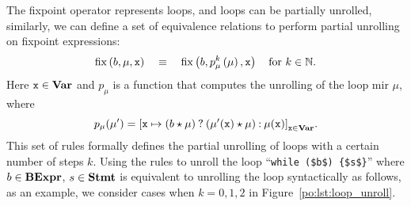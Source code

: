 The fixpoint operator represents loops, and loops can be partially unrolled,
similarly, we can define a set of equivalence relations to perform partial
unrolling on fixpoint expressions:
\begin{equation}
    \operatorname{\mathrm{fix}}\left(b, \mu, \texttt{x}\right)
    \quad \equiv \quad
    \operatorname{\mathrm{fix}}\left(b, p_\mu^k \left(\mu\right), \texttt{x}\right)
    \quad \text{for $k \in \mathbb{N}$}.
    \label{po:eq:unroll}
\end{equation}
Here $\texttt{x} \in \mathbf{Var}$ and $p_\mu$ is a function that computes the unrolling
of the loop \gls{mir} $\mu$, where
\begin{equation}
    p_\mu(\mu^\prime) = {\left[
        \texttt{x} \mapsto ( b \mathbin{\star} \mu ) \mathbin{?}
            ( \mu^\prime(\texttt{x}) \mathbin{\star} \mu ) \mathbin{:} \mu(\texttt{x})
    \right]}_{\texttt{x} \in \mathbf{Var}}.
\end{equation}
This set of rules formally defines the partial unrolling of loops with
a certain number of steps $k$.  Using the rules to unroll the loop
``\lstinline[basicstyle=\tt]|while ($b$) {$s$}|'' where $b \in \mathbf{BExpr}$,
$s \in \mathbf{Stmt}$ is equivalent to unrolling the loop syntactically
as follows, as an example, we consider cases when $k = 0, 1, 2$ in
Figure~\ref{po:lst:loop_unroll}.
